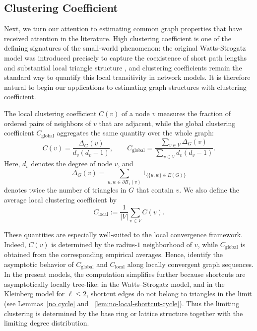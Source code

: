 \documentclass[10pt]{amsart}
\begin{document}
\subsection{Clustering Coefficient}
Next, we turn our attention to estimating common graph properties that have received attention in the literature.
High clustering coefficient is one of the defining signatures of the small-world phenomenon: the original Watts-Strogatz model was introduced precisely to capture the coexistence of short path lengths and substantial local triangle structure \cite{watts}, and clustering coefficients remain the standard way to quantify this local transitivity in network models. It is therefore natural to begin our applications to estimating graph structures with clustering coefficient.



The local clustering coefficient $C(v)$ of a node $v$ measures the fraction of ordered pairs of neighbors of $v$ that are adjacent, while the global clustering coefficient $C_{\mathrm{global}}$ aggregates the same quantity over the whole graph:
\[
C(v)=\frac{\Delta_G(v)}{d_v(d_v-1)}, \qquad
C_{\mathrm{global}}=\frac{\sum_{v\in V}\Delta_G(v)}{\sum_{v\in V} d_v(d_v-1)}.
\]
Here, $d_v$ denotes the degree of node $v$, and
\[
\Delta_G(v)=\sum_{u,w\in \partial B_1(v)} 1_{\{\{u,w\}\in E(G)\}}
\]
denotes twice the number of triangles in $G$ that contain $v$. We also define the average local clustering coefficient by
\[
C_{\mathrm{local}}:=\frac{1}{|V|}\sum_{v\in V} C(v).
\]



These quantities are especially well-suited to the local convergence framework. Indeed, $C(v)$ is determined by the radius-$1$ neighborhood of $v$, while $C_{\mathrm{global}}$ is obtained from the corresponding empirical averages. Hence, \cite[Theorems 2.22 and 2.23]{remco} identify the asymptotic behavior of $C_{\mathrm{global}}$ and $C_{\mathrm{local}}$ along locally convergent graph sequences. In the present models, the computation simplifies further because shortcuts are asymptotically locally tree-like: in the Watts--Strogatz model, and in the Kleinberg model for $\ell \leq 2$, shortcut edges do not belong to triangles in the limit (see  Lemmas~\ref{no cycle} and ~\ref{lem:no-local-shortcut-cycle}). Thus the limiting clustering is determined by the base ring or lattice structure together with the limiting degree distribution.
\end{document}
